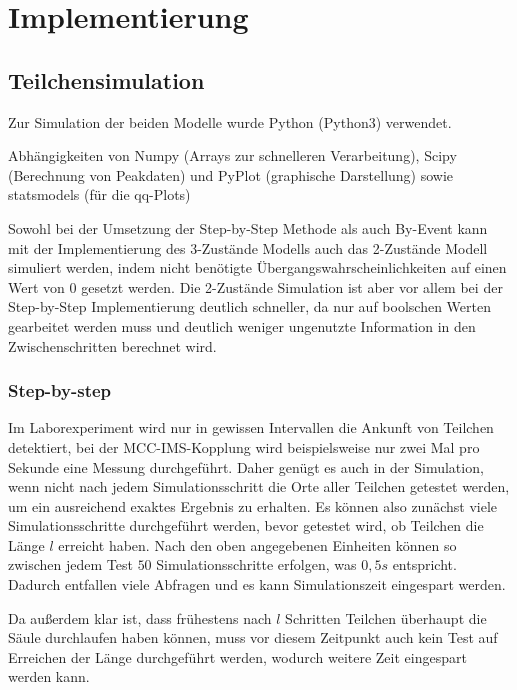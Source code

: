 
\chapter{Implementierung}
\label{chapter:imp}


\section{Teilchensimulation}
Zur Simulation der beiden Modelle wurde Python (Python3) verwendet.

Abhängigkeiten von Numpy (Arrays zur schnelleren Verarbeitung), Scipy (Berechnung von Peakdaten) und PyPlot (graphische Darstellung) sowie statsmodels (für die qq-Plots)

Sowohl bei der Umsetzung der Step-by-Step Methode als auch By-Event kann mit der Implementierung des 3-Zustände Modells auch das 2-Zustände Modell simuliert werden, indem nicht benötigte Übergangswahrscheinlichkeiten auf einen Wert von $0$ gesetzt werden. Die 2-Zustände Simulation ist aber vor allem bei der Step-by-Step Implementierung deutlich schneller, da nur auf boolschen Werten gearbeitet werden muss und deutlich weniger ungenutzte Information in den Zwischenschritten berechnet wird.


\subsection{Step-by-step}

Im Laborexperiment wird nur in gewissen Intervallen die Ankunft von Teilchen detektiert, bei der MCC-IMS-Kopplung wird beispielsweise nur zwei Mal pro Sekunde eine Messung durchgeführt. Daher genügt es auch in der Simulation, wenn nicht nach jedem Simulationsschritt die Orte aller Teilchen getestet werden, um ein ausreichend exaktes Ergebnis zu erhalten.
Es können also zunächst viele Simulationsschritte durchgeführt werden, bevor getestet wird, ob Teilchen die Länge $l$ erreicht haben. Nach den oben angegebenen Einheiten können so zwischen jedem Test $50$ Simulationsschritte erfolgen, was $0,5 s$ entspricht. Dadurch entfallen viele Abfragen und es kann Simulationszeit eingespart werden. 

Da außerdem klar ist, dass frühestens nach $l$ Schritten Teilchen überhaupt die Säule durchlaufen haben können, muss vor diesem Zeitpunkt auch kein Test auf Erreichen der Länge durchgeführt werden, wodurch weitere Zeit eingespart werden kann.


